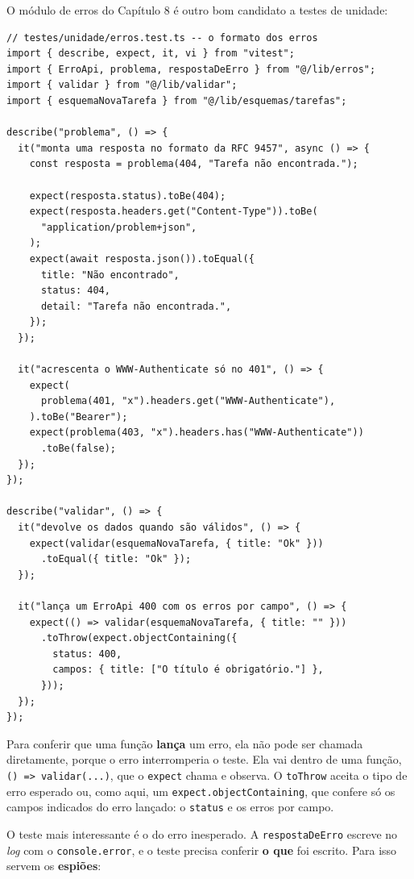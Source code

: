 O módulo de erros do Capítulo 8 é outro bom candidato a testes de unidade:

\begin{codigo}
\begin{Verbatim}[breaklines=true, breaksymbolleft={}, fontsize=\footnotesize]
// testes/unidade/erros.test.ts -- o formato dos erros
import { describe, expect, it, vi } from "vitest";
import { ErroApi, problema, respostaDeErro } from "@/lib/erros";
import { validar } from "@/lib/validar";
import { esquemaNovaTarefa } from "@/lib/esquemas/tarefas";

describe("problema", () => {
  it("monta uma resposta no formato da RFC 9457", async () => {
    const resposta = problema(404, "Tarefa não encontrada.");

    expect(resposta.status).toBe(404);
    expect(resposta.headers.get("Content-Type")).toBe(
      "application/problem+json",
    );
    expect(await resposta.json()).toEqual({
      title: "Não encontrado",
      status: 404,
      detail: "Tarefa não encontrada.",
    });
  });

  it("acrescenta o WWW-Authenticate só no 401", () => {
    expect(
      problema(401, "x").headers.get("WWW-Authenticate"),
    ).toBe("Bearer");
    expect(problema(403, "x").headers.has("WWW-Authenticate"))
      .toBe(false);
  });
});

describe("validar", () => {
  it("devolve os dados quando são válidos", () => {
    expect(validar(esquemaNovaTarefa, { title: "Ok" }))
      .toEqual({ title: "Ok" });
  });

  it("lança um ErroApi 400 com os erros por campo", () => {
    expect(() => validar(esquemaNovaTarefa, { title: "" }))
      .toThrow(expect.objectContaining({
        status: 400,
        campos: { title: ["O título é obrigatório."] },
      }));
  });
});
\end{Verbatim}
\end{codigo}

Para conferir que uma função \textbf{lança} um erro, ela não pode ser chamada diretamente, porque o erro interromperia o teste. Ela vai dentro de uma função, \texttt{() => validar(...)}, que o \texttt{expect} chama e observa. O \texttt{toThrow} aceita o tipo de erro esperado ou, como aqui, um \texttt{expect.objectContaining}, que confere só os campos indicados do erro lançado: o \texttt{status} e os erros por campo.

O teste mais interessante é o do erro inesperado. A \texttt{respostaDeErro} escreve no \textit{log} com o \texttt{console.error}, e o teste precisa conferir \textbf{o que} foi escrito. Para isso servem os \textbf{espiões}:

